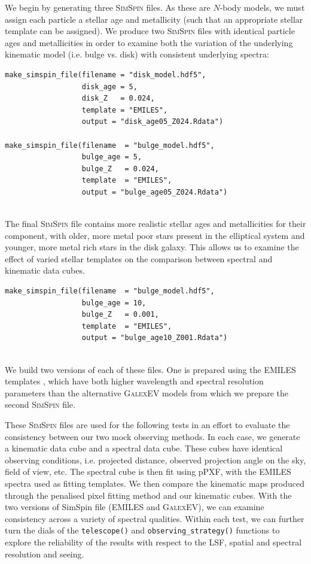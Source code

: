 \documentclass[
  journal=pasa,
  manuscript=research-paper, %
  year=2020,
  volume=37,
]{cup-journal}
\newcommand{\simspin}[1]{\textsc{SimSpin}#1} %
\newcommand{\telescope}[1]{\texttt{telescope()}#1}
\newcommand{\observingstrategy}[1]{\texttt{observing\_strategy()}#1}
\begin{document}
We begin by generating three \simspin{} files. 
As these are $N$-body models, we must assign each particle a stellar age and metallicity (such that an appropriate stellar template can be assigned). 
We produce two \simspin{} files with identical particle ages and metallicities in order to examine both the variation of the underlying kinematic model (i.e. bulge vs. disk) with consistent underlying spectra:
    
\begin{lstlisting}[basicstyle=\fontsize{6}{8}\selectfont\ttfamily]
make_simspin_file(filename = "disk_model.hdf5", 
                  disk_age = 5, 
                  disk_Z   = 0.024, 
                  template = "EMILES", 
                  output = "disk_age05_Z024.Rdata")
    
make_simspin_file(filename  = "bulge_model.hdf5", 
                  bulge_age = 5, 
                  bulge_Z   = 0.024, 
                  template  = "EMILES",
                  output = "bulge_age05_Z024.Rdata")
                  
\end{lstlisting}
    
The final \simspin{} file contains more realistic stellar ages and metallicities for their component, with older, more metal poor stars present in the elliptical system and younger, more metal rich stars in the disk galaxy. 
This allows us to examine the effect of varied stellar templates on the comparison between spectral and kinematic data cubes.

\begin{lstlisting}[basicstyle=\fontsize{6}{8}\selectfont\ttfamily]
make_simspin_file(filename  = "bulge_model.hdf5", 
                  bulge_age = 10, 
                  bulge_Z   = 0.001, 
                  template  = "EMILES",
                  output = "bulge_age10_Z001.Rdata")
                  
\end{lstlisting}

We build two versions of each of these files. 
One is prepared using the \textsc{EMILES} templates \citep{Vazdekis2016UV-extendedGalaxies}, which have both higher wavelength and spectral resolution parameters than the alternative \textsc{GalexEV} models \citep{Bruzual2003Stellar2003} from which we prepare the second \simspin{} file.  

These \simspin{} files are used for the following tests in an effort to evaluate the consistency between our two mock observing methods.
In each case, we generate a kinematic data cube and a spectral data cube.
These cubes have identical observing conditions, i.e. projected distance, observed projection angle on the sky, field of view, etc. 
The spectral cube is then fit using pPXF, with the EMILES spectra used as fitting templates.
We then compare the kinematic maps produced through the penalised pixel fitting method and our kinematic cubes. 
With the two versions of SimSpin file (\textsc{EMILES} and \textsc{GalexEV}), we can examine consistency across a variety of spectral qualities.
Within each test, we can further turn the dials of the \telescope{} and \observingstrategy{} functions to explore the reliability of the results with respect to the LSF, spatial and spectral resolution and seeing.
\end{document}
